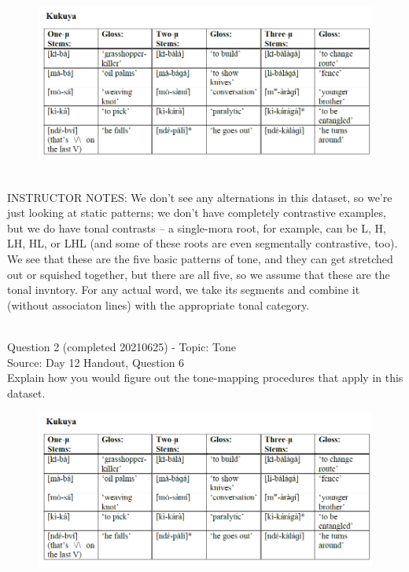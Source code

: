\documentclass[12pt]{article}
\begin{document}
\begin{figure}[H]
\includegraphics{../images/kukuya.png}
\end{figure}

~\\
INSTRUCTOR NOTES: We don't see any alternations in this dataset, so we're just looking at static patterns; we don't have completely contrastive examples, but we do have tonal contrasts -- a single-mora root, for example, can be L, H, LH, HL, or LHL (and some of these roots are even segmentally contrastive, too). We see that these are the five basic patterns of tone, and they can get stretched out or squished together, but there are all five, so we assume that these are the tonal invntory. For any actual word, we take its segments and combine it (without associaton lines) with the appropriate tonal category.


~\\

{\large Question 2} (completed 20210625) - Topic: Tone\\
Source: Day 12 Handout, Question 6\\

Explain how you would figure out the tone-mapping procedures that apply in this dataset.\\

\begin{figure}[H]
\includegraphics{../images/kukuya.png}
\end{figure}
\end{document}
